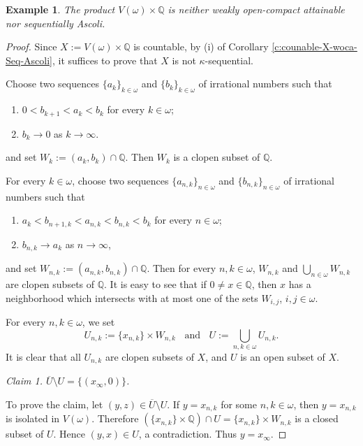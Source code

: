 \documentclass[preprint,11pt]{elsarticle}
\newtheorem{example}[theorem]{Example}
\numberwithin{equation}{section}
\numberwithin{theorem}{section}
\newcommand{\w}{\omega}
\newcommand{\SM}{{\setminus}}
\begin{document}
\begin{example} \label{exa:Veer-Q}
The product $V(\w)\times \mathbb{Q}$ is neither weakly open-compact attainable nor sequentially Ascoli.
\end{example}

\begin{proof}
Since $X:=V(\w)\times \mathbb{Q}$ is countable, by (i) of Corollary \ref{c:counable-X-woca-Seq-Ascoli}, it suffices to prove that $X$ is not $\kappa$-sequential.

Choose two sequences $\{a_k\}_{k\in\w}$ and  $\{b_k\}_{k\in\w}$ of irrational numbers such that
\begin{enumerate}
\item[(a)] $0<b_{k+1}<a_k<b_k$ for every $k\in\w$;
\item[(b)] $b_k\to 0$ as $k\to\infty$.
\end{enumerate}
and set  $W_k:=(a_k,b_k)\cap \mathbb{Q}$. Then $W_k$ is a clopen subset of $\mathbb{Q}$.

For every $k\in\w$, choose two sequences $\{a_{n,k}\}_{n\in\w}$ and  $\{b_{n,k}\}_{n\in\w}$ of irrational numbers such that
\begin{enumerate}
\item[(c)] $a_k<b_{n+1,k}<a_{n,k}<b_{n,k}< b_k$ for every $n\in\w$;
\item[(d)] $b_{n,k}\to a_k$ as $n\to\infty$,
\end{enumerate}
and set $W_{n,k}:=(a_{n,k},b_{n,k})\cap \mathbb{Q}$. Then for every $n,k\in\w$, $W_{n,k}$ and $\bigcup_{n\in\w} W_{n,k}$ are clopen subsets of $\mathbb{Q}$. It is easy to see that if $0\not=x\in\mathbb{Q}$, then $x$ has a neighborhood which intersects with at most one of the sets $W_{i,j}$, $i,j\in\w$.

For every $n,k\in\w$, we set
\[
U_{n,k}:=\{x_{n,k}\}\times W_{n,k} \;\; \mbox{ and }\;\;  U:=\bigcup_{n,k\in\w} U_{n,k}.
\]
It is clear that all $U_{n,k}$ are clopen subsets of $X$, and $U$ is an open subset of $X$.
\smallskip

{\em Claim 1. $\overline{U}\SM U=\{(x_\infty,0)\}$.}
\smallskip

To prove the claim, let $(y,z)\in \overline{U}\SM U$. If $y=x_{n,k}$ for some $n,k\in\w$, then $y=x_{n,k}$ is isolated in $V(\w)$. Therefore $(\{x_{n,k}\}\times \mathbb{Q})\cap U= \{x_{n,k}\}\times W_{n,k}$ is a closed subset of $U$. Hence $(y,x)\in U$, a contradiction. Thus $y=x_\infty$.


\end{proof}
\end{document}
